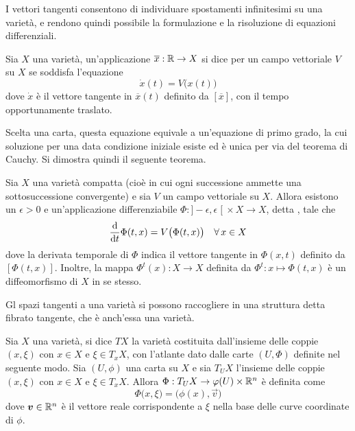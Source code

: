 I vettori tangenti consentono di individuare spostamenti infinitesimi su una varietà, e rendono quindi possibile la formulazione e la risoluzione di equazioni differenziali.

\begin{definition}
  Sia $X$ una varietà, un'applicazione $\overline{x}:\mathbb{R} \to X$ si dice  per un campo vettoriale $V$ su $X$ se soddisfa l'equazione \begin{equation*}
  \dot{x}(t) = V\big(x(t)\big)
  \end{equation*} 
  dove $\dot{x}$ è il vettore tangente in $\overline{x}(t)$ definito da $[\overline{x}]$, con il tempo opportunamente traslato.
\end{definition}
\begin{remark}
  Scelta una carta, questa equazione equivale a un'equazione di primo grado, la cui soluzione per una data condizione iniziale esiste ed è unica per via del teorema di Cauchy. Si dimostra quindi il seguente teorema.
\end{remark}
\begin{theorem}
  Sia $X$ una varietà compatta (cioè in cui ogni successione ammette una sottosuccessione convergente) e sia $V$ un campo vettoriale su $X$. Allora esistono un $\epsilon > 0$ e un'applicazione differenziabile $\Phi:]-\epsilon, \epsilon\;[\ \times X \to X$, detta , tale che \begin{equation*}
  \dv{t} \Phi(t,x) = V\big( \Phi(t,x)\big) \quad \forall\, x \in  X
  \end{equation*} 
  dove la derivata temporale di $\Phi$ indica il vettore tangente in $\Phi(x,t)$ definito da $[\Phi(t,x)]$. Inoltre, la mappa $\Phi^t(x):X \to X$ definita da $\Phi^t:x \mapsto \Phi(t,x)$ è un diffeomorfismo di $X$ in se stesso.
\end{theorem}

Gl spazi tangenti a una varietà si possono raccogliere in una struttura detta fibrato tangente, che è anch'essa una varietà.

\begin{definition} \label{def:tanBundle}
  Sia $X$ una varietà, si dice  $TX$ la varietà costituita dall'insieme delle coppie $(x,\xi)$ con $x \in X$ e $\xi \in T_x X$, con l'atlante dato dalle carte $(U, \Phi)$ definite nel seguente modo. Sia $(U, \phi)$ una carta su $X$ e sia $T_U X$ l'insieme delle coppie $(x,\xi)$ con $x \in X$ e $\xi \in T_x X$. Allora $\Phi:T_U X \to \varphi(U) \times \mathbb{R}^{n}$ è definita come \begin{equation}
  \Phi \big(x,\xi\big) = \big(\phi(x), \vec{v}\big)
  \end{equation} 
  dove $\boldsymbol{v} \in \mathbb{R}^{n}$ è il vettore reale corrispondente a $\xi$ nella base delle curve coordinate di $\phi$.
\end{definition}

